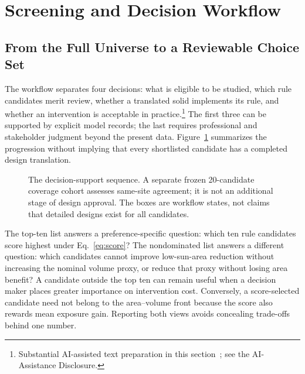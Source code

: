 \documentclass{llncs}
\newcommand{\aidraft}{\footnote{Substantial AI-assisted text preparation in this section~\cite{openai2026}; see the AI-Assistance Disclosure.}}
\begin{document}
\section{Screening and Decision Workflow}
\subsection{From the Full Universe to a Reviewable Choice Set}
The workflow separates four decisions: what is eligible to be studied, which rule candidates merit review, whether a translated solid implements its rule, and whether an intervention is acceptable in practice.\aidraft{} The first three can be supported by explicit model records; the last requires professional and stakeholder judgment beyond the present data. Figure~\ref{fig:workflow} summarizes the progression without implying that every shortlisted candidate has a completed design translation.

\begin{figure}[tbp]
\centering
{}
\caption{The decision-support sequence. A separate frozen 20-candidate coverage cohort assesses same-site agreement; it is not an additional stage of design approval. The boxes are workflow states, not claims that detailed designs exist for all candidates.}
\label{fig:workflow}
\end{figure}

The top-ten list answers a preference-specific question: which ten rule candidates score highest under Eq.~\ref{eq:score}? The nondominated list answers a different question: which candidates cannot improve low-sun-area reduction without increasing the nominal volume proxy, or reduce that proxy without losing area benefit? A candidate outside the top ten can remain useful when a decision maker places greater importance on intervention cost. Conversely, a score-selected candidate need not belong to the area--volume front because the score also rewards mean exposure gain. Reporting both views avoids concealing trade-offs behind one number.
\end{document}
